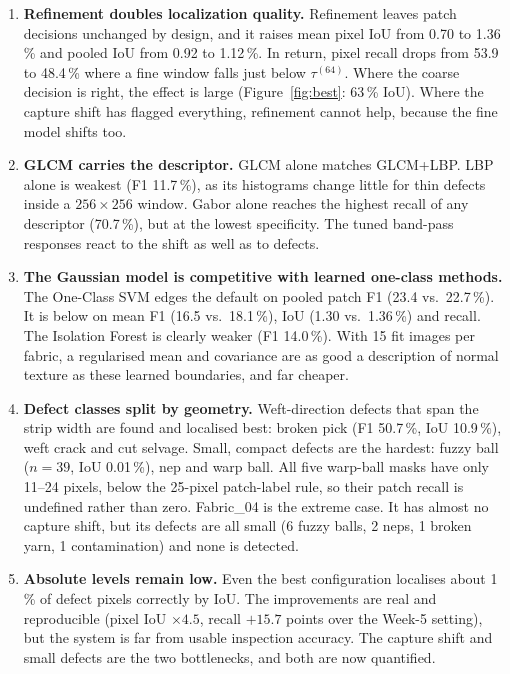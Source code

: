\documentclass[11pt,a4paper]{article}
\begin{document}
\begin{enumerate}
  \item \textbf{Refinement doubles localization quality.} Refinement leaves patch decisions unchanged by design, and it raises mean pixel IoU from 0.70 to 1.36\,\% and pooled IoU from 0.92 to 1.12\,\%. In return, pixel recall drops from 53.9 to 48.4\,\% where a fine window falls just below $\tau^{(64)}$. Where the coarse decision is right, the effect is large (Figure~\ref{fig:best}: 63\,\% IoU). Where the capture shift has flagged everything, refinement cannot help, because the fine model shifts too.
  \item \textbf{GLCM carries the descriptor.} GLCM alone matches GLCM+LBP. LBP alone is weakest (F1 11.7\,\%), as its histograms change little for thin defects inside a $256\times256$ window. Gabor alone reaches the highest recall of any descriptor (70.7\,\%), but at the lowest specificity. The tuned band-pass responses react to the shift as well as to defects.
  \item \textbf{The Gaussian model is competitive with learned one-class methods.} The One-Class SVM edges the default on pooled patch F1 (23.4 vs.\ 22.7\,\%). It is below on mean F1 (16.5 vs.\ 18.1\,\%), IoU (1.30 vs.\ 1.36\,\%) and recall. The Isolation Forest is clearly weaker (F1 14.0\,\%). With 15 fit images per fabric, a regularised mean and covariance are as good a description of normal texture as these learned boundaries, and far cheaper.
  \item \textbf{Defect classes split by geometry.} Weft-direction defects that span the strip width are found and localised best: broken pick (F1 50.7\,\%, IoU 10.9\,\%), weft crack and cut selvage. Small, compact defects are the hardest: fuzzy ball ($n=39$, IoU 0.01\,\%), nep and warp ball. All five warp-ball masks have only 11--24 pixels, below the 25-pixel patch-label rule, so their patch recall is undefined rather than zero. Fabric\_04 is the extreme case. It has almost no capture shift, but its defects are all small (6 fuzzy balls, 2 neps, 1 broken yarn, 1 contamination) and none is detected.
  \item \textbf{Absolute levels remain low.} Even the best configuration localises about 1\,\% of defect pixels correctly by IoU. The improvements are real and reproducible (pixel IoU $\times4.5$, recall $+15.7$ points over the Week-5 setting), but the system is far from usable inspection accuracy. The capture shift and small defects are the two bottlenecks, and both are now quantified.
\end{enumerate}
\end{document}
